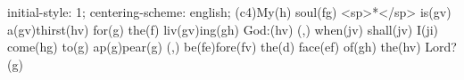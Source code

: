 initial-style: 1;
centering-scheme: english;
(c4)My(h) soul(fg) <sp>*</sp> is(gv) a(gv)thirst(hv) for(g) the(f) liv(gv)ing(gh) God:(hv) (,) when(jv) shall(jv) I(ji) come(hg) to(g) ap(g)pear(g) (,) be(fe)fore(fv) the(d) face(ef) of(gh) the(hv) Lord?(g)
